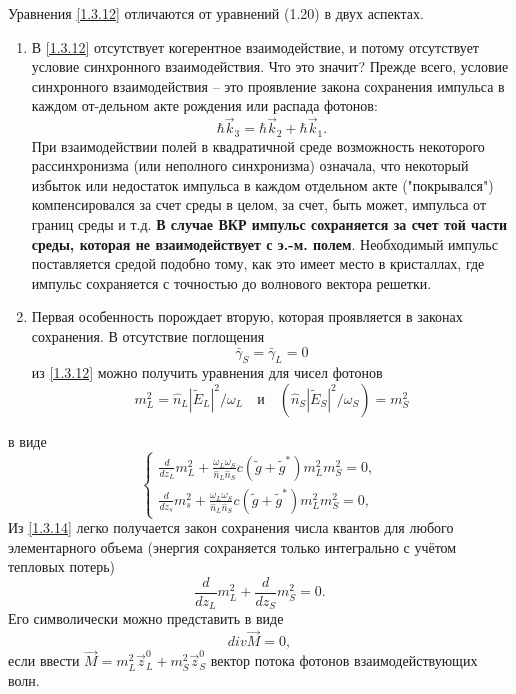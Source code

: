 \documentclass[a4paper]{article}
\begin{document}
Уравнения \eqref{1.3.12} отличаются от уравнений (1.20) в двух аспектах.
\begin{enumerate}
	\item В \eqref{1.3.12} отсутствует когерентное взаимодействие, и потому отсутствует условие синхронного взаимодействия. Что это значит? Прежде всего, условие синхронного взаимодействия – это проявление закона сохранения импульса в каждом от-дельном акте рождения или распада фотонов: $$\hbar\vec{k}_{3}=\hbar\vec{k}_{2}+\hbar\vec{k}_{1}.$$
	При взаимодействии полей в квадратичной среде возможность некоторого рассинхронизма (или неполного синхронизма) означала, что некоторый избыток или недостаток импульса в каждом отдельном акте ("покрывался") компенсировался за счет среды в целом, за счет, быть может, импульса от границ среды и т.д. \textbf{В случае ВКР импульс сохраняется за счет той части среды, которая не взаимодействует с э.-м. полем}. Необходимый импульс поставляется средой подобно тому, как это имеет место в кристаллах, где импульс сохраняется с точностью до волнового вектора решетки.
	\item Первая особенность порождает вторую, которая проявляется в законах сохранения. В отсутствие поглощения $$\bar{\gamma}_{S}=\bar{\gamma}_{L}=0$$ из \eqref{1.3.12} можно получить уравнения для чисел фотонов $$m_{L}^{2}=\hat{n}_{L}\left|\tilde{E}_{L}\right|^{2}/\omega_{L}\quad\text{и}\quad(\hat{n}_{S}\left|\tilde{E}_{S}\right|^{2}/\omega_{S})=m_{S}^{2}$$
\end{enumerate}
в виде
\begin{equation}
	\begin{cases}
		\frac{d}{dz_{L}}m_{L}^{2}+\frac{\omega_{L}\omega_{S}}{\hat{n}_{L}\hat{n}_{S}}c(\tilde{g}+\tilde{g}^{*})m_{L}^{2}m_{S}^{2}=0,\\
		\frac{d}{dz_{s}}m_{s}^{2}+\frac{\omega_{L}\omega_{S}}{\hat{n}_{L}\hat{n}_{S}}c(\tilde{g}+\tilde{g}^{*})m_{L}^{2}m_{S}^{2}=0,
	\end{cases}\label{1.3.14}
\end{equation}
Из \eqref{1.3.14} легко получается закон сохранения числа квантов для любого элементарного объема (энергия сохраняется только интегрально с учётом тепловых потерь)
\begin{equation}
	\frac{d}{dz_{L}}m_{L}^{2}+\frac{d}{dz_{S}}m_{S}^{2}=0.\label{1.3.15}
\end{equation}
Его символически можно представить в виде
\begin{equation}
	div\vec{M}=0,\tag{15'}\label{1.3.15'}
\end{equation}
если ввести $\vec{M}=m_{L}^{2}\vec{z}_{L}^{0}+m_{S}^{2}\vec{z}_{S}^{0}$ вектор потока фотонов взаимодействующих волн. 
\end{document}

